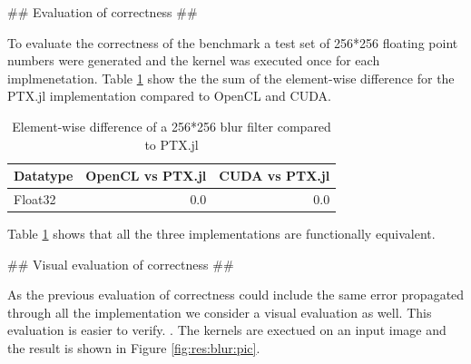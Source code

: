 \begin{markdown}
## Evaluation of correctness ##

To evaluate the correctness of the benchmark a test set of 256*256
floating point numbers were generated and the kernel was executed once
for each implmenetation. Table \ref{tab:res:blur:diff} show the the
sum of the element-wise difference for the PTX.jl implementation
compared to OpenCL and CUDA.

\begin{table}[H]
  \centering
  \begin{tabular}{|l|r|r|}
    \hline
    Datatype & OpenCL vs PTX.jl & CUDA vs PTX.jl \\
    \hline
    Float32  & 0.0 & 0.0 \\
    \hline
  \end{tabular}
  \caption{Element-wise difference of a 256*256 blur filter compared to PTX.jl}
  \label{tab:res:blur:diff}
\end{table}

Table \ref{tab:res:blur:diff} shows that all the three implementations
are functionally equivalent.

## Visual evaluation of correctness ##

As the previous evaluation of correctness could include the same error
propagated through all the implementation we consider a visual
evaluation as well. This evaluation is easier to verify. . The kernels
are exectued on an input image and the result is shown in Figure
\ref{fig:res:blur:pic}.


\end{markdown}

